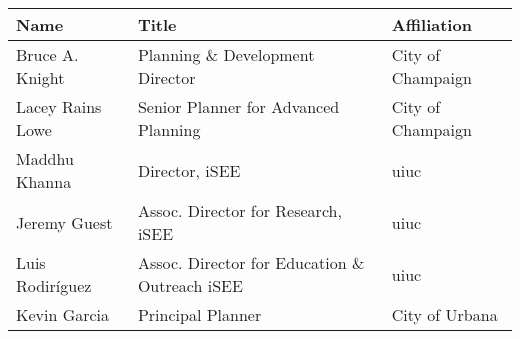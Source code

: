 
\begin{tabular}[pos]{lll}
    Name & Title & Affiliation \\
    \toprule
    Bruce A. Knight & Planning \& Development Director & City of Champaign\\
    Lacey Rains Lowe & Senior Planner for Advanced Planning & City of Champaign\\
    Maddhu Khanna & Director, iSEE & \ac{uiuc}\\
    Jeremy Guest &Assoc. Director for Research, iSEE& \ac{uiuc}\\
    Luis Rodir\'iguez & Assoc. Director for Education \& Outreach iSEE& \ac{uiuc}\\
    Kevin Garcia & Principal Planner & City of Urbana\\
    \bottomrule
\end{tabular}